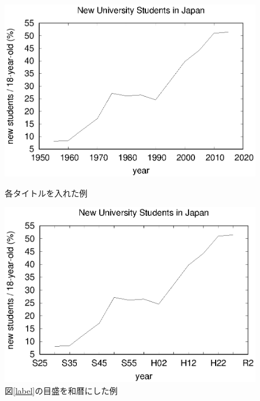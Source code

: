 \documentclass[a4j]{ujarticle} %
\begin{document}
\begin{figure}
\begin{minipage}[hbtp]{0.49\textwidth}
\begin{center}
\includegraphics[width=\hsize]{univ.19people2.eps}
\caption{各タイトルを入れた例}
\label{label}
\end{center}
\end{minipage}
\begin{minipage}[hbtp]{0.49\textwidth}
\begin{center}
\includegraphics[width=\hsize]{univ.19people3.eps}
\caption{図\ref{label}の目盛を和暦にした例}
\label{tics}
\end{center}
\end{minipage}
\end{figure}
\end{document}
